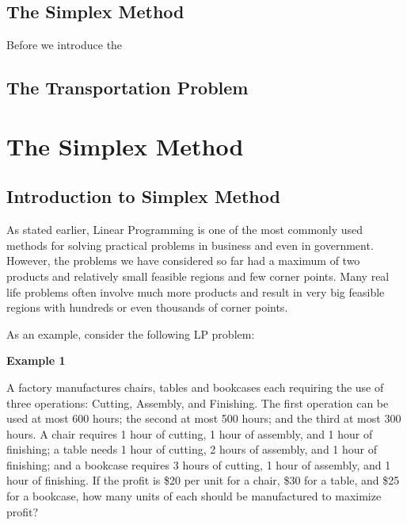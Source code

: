 \documentclass[
  letterpaper,
  DIV=11,
  numbers=noendperiod]{scrreprt}
\begin{document}
\hypertarget{the-simplex-method}{%
\section{The Simplex Method}\label{the-simplex-method}}

Before we introduce the

\hypertarget{the-transportation-problem}{%
\section{The Transportation Problem}\label{the-transportation-problem}}

\hypertarget{the-simplex-method-1}{%
\chapter{The Simplex Method}\label{the-simplex-method-1}}

\hypertarget{introduction-to-simplex-method}{%
\section{Introduction to Simplex
Method}\label{introduction-to-simplex-method}}

As stated earlier, Linear Programming is one of the most commonly used
methods for solving practical problems in business and even in
government. However, the problems we have considered so far had a
maximum of two products and relatively small feasible regions and few
corner points. Many real life problems often involve much more products
and result in very big feasible regions with hundreds or even thousands
of corner points.

As an example, consider the following LP problem:

\textbf{Example 1}

A factory manufactures chairs, tables and bookcases each requiring the
use of three operations: Cutting, Assembly, and Finishing. The first
operation can be used at most 600 hours; the second at most 500 hours;
and the third at most 300 hours. A chair requires 1 hour of cutting, 1
hour of assembly, and 1 hour of finishing; a table needs 1 hour of
cutting, 2 hours of assembly, and 1 hour of finishing; and a bookcase
requires 3 hours of cutting, 1 hour of assembly, and 1 hour of
finishing. If the profit is \$20 per unit for a chair, \$30 for a table,
and \$25 for a bookcase, how many units of each should be manufactured
to maximize profit?
\end{document}

